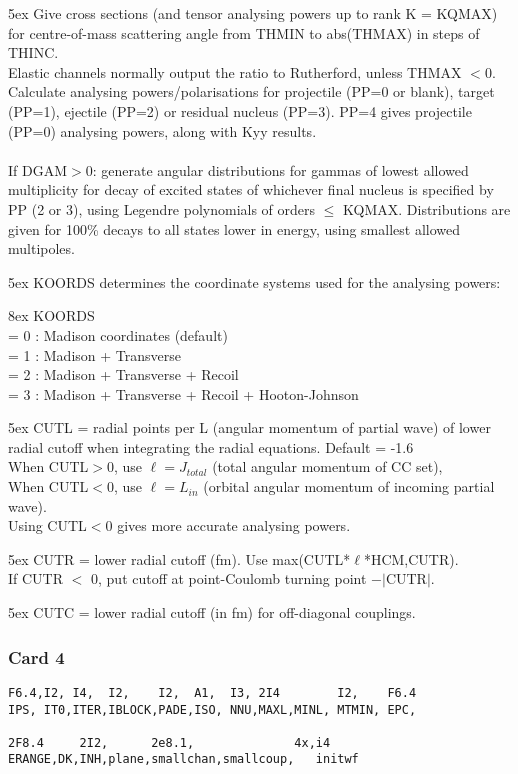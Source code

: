 \documentclass[11pt]{article}
\begin{document}
\hangindent 5ex
Give cross sections (and tensor analysing powers up to rank K = KQMAX)
for centre-of-mass scattering angle from THMIN
to abs(THMAX) in steps of THINC.\\
Elastic channels normally output the ratio to Rutherford, unless THMAX $< 0$.\\
Calculate analysing powers/polarisations for projectile (PP=0 or blank),
target (PP=1), ejectile (PP=2) or residual nucleus (PP=3).
PP=4 gives projectile (PP=0) analysing powers, along with Kyy results.
\\ ~\\
If DGAM$>$0:  generate angular distributions for gammas of lowest allowed multiplicity for decay
of excited states of whichever final nucleus is specified by PP (2 or 3),
using Legendre polynomials  of orders $\leq$ KQMAX. Distributions are given for 100\%
decays to all states lower in energy, using smallest allowed multipoles.

\hangindent 5ex
KOORDS determines the coordinate systems used for the analysing powers:

\hangindent 8ex  KOORDS
\\  = 0 : Madison coordinates (default)
\\  = 1 : Madison + Transverse
\\  = 2 : Madison + Transverse + Recoil
\\  = 3 : Madison + Transverse + Recoil + Hooton-Johnson



\hangindent 5ex
CUTL = radial points per L (angular momentum of partial wave)
of lower radial cutoff when integrating the radial equations. Default = -1.6\\
When CUTL$>$0, use $\ell=J_{total}$ (total angular momentum of CC set),\\
When CUTL$<$0, use $\ell=L_{in}$ (orbital angular momentum of incoming partial wave).\\
Using  CUTL$<$0 gives more accurate analysing powers.

\hangindent 5ex
CUTR = lower radial cutoff (fm).  Use max(CUTL*$\ell$*HCM,CUTR).\\
If CUTR $<$ 0, put cutoff at point-Coulomb turning point $- |$CUTR$|$.

\hangindent 5ex
CUTC = lower radial cutoff (in fm) for off-diagonal couplings.
\newpage

\subsubsection*{Card 4}
\begin{verbatim}
F6.4,I2, I4,  I2,    I2,  A1,  I3, 2I4        I2,    F6.4
IPS, IT0,ITER,IBLOCK,PADE,ISO, NNU,MAXL,MINL, MTMIN, EPC,

2F8.4     2I2,      2e8.1,              4x,i4
ERANGE,DK,INH,plane,smallchan,smallcoup,   initwf
\end{verbatim}
\end{document}
